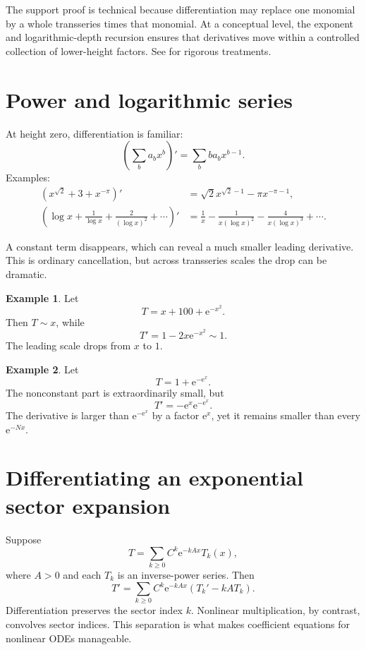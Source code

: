 \documentclass[11pt,openany]{book}
\theoremstyle{definition}
\newtheorem{example}{Example}[chapter]
\theoremstyle{plain}
\theoremstyle{remark}
\newcommand{\e}{\mathrm{e}}
\newcommand{\asym}{\sim}
\begin{document}
The support proof is technical because differentiation may replace one monomial by a whole transseries times that monomial. At a conceptual level, the exponent and logarithmic-depth recursion ensures that derivatives move within a controlled collection of lower-height factors. See \cite{vdhoeven-book,edgar-beginners,adh-book} for rigorous treatments.

\section{Power and logarithmic series}

At height zero, differentiation is familiar:
\[
 \left(\sum_ba_bx^b\right)'
 =\sum_bba_bx^{b-1}.
\]
Examples:
\begin{align*}
 \left(x^{\sqrt2}+3+x^{-\pi}\right)'
 &=\sqrt2x^{\sqrt2-1}-\pi x^{-\pi-1},\\
 \left(\log x+\frac1{\log x}
 +\frac{2}{(\log x)^2}+\cdots\right)'
 &=\frac1x-\frac1{x(\log x)^2}
 -\frac4{x(\log x)^3}+\cdots.
\end{align*}

A constant term disappears, which can reveal a much smaller leading derivative. This is ordinary cancellation, but across transseries scales the drop can be dramatic.

\begin{example}
Let
\[
 T=x+100+\e^{-x^2}.
\]
Then $T\asym x$, while
\[
 T'=1-2x\e^{-x^2}\asym1.
\]
The leading scale drops from $x$ to $1$.
\end{example}

\begin{example}
Let
\[
 T=1+\e^{-\e^x}.
\]
The nonconstant part is extraordinarily small, but
\[
 T'=-\e^x\e^{-\e^x}.
\]
The derivative is larger than $\e^{-\e^x}$ by a factor $\e^x$, yet it remains smaller than every $\e^{-Nx}$.
\end{example}

\section{Differentiating an exponential sector expansion}

Suppose
\[
 T=\sum_{k\ge0}C^k\e^{-kAx}T_k(x),
\]
where $A>0$ and each $T_k$ is an inverse-power series. Then
\begin{equation}\label{eq:sector-derivative}
 T'=\sum_{k\ge0}C^k\e^{-kAx}
 \left(T_k'-kA T_k\right).
\end{equation}
Differentiation preserves the sector index $k$. Nonlinear multiplication, by contrast, convolves sector indices. This separation is what makes coefficient equations for nonlinear ODEs manageable.
\end{document}
